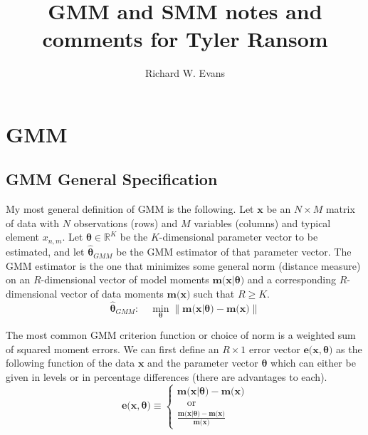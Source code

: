 \documentclass[letterpaper,12pt]{article}
\theoremstyle{definition}
\newcommand\norm[1]{\left\lVert#1\right\rVert}
\begin{document}
\title{GMM and SMM notes and comments for Tyler Ransom}
\author{Richard W. Evans}
\maketitle



\section{GMM}\label{SecGMM}

  \setcounter{subsection}{-1}

  \subsection{GMM General Specification}\label{SecGMMgen}

    My most general definition of GMM is the following. Let $\bm{x}$ be an $N\times M$ matrix of data with $N$ observations (rows) and $M$ variables (columns) and typical element $x_{n,m}$. Let $\bm{\theta}\in\mathbb{R}^K$ be the $K$-dimensional parameter vector to be estimated, and let $\bm{\hat{\theta}}_{GMM}$ be the GMM estimator of that parameter vector. The GMM estimator is the one that minimizes some general norm (distance measure) on an $R$-dimensional vector of model moments $\bm{m}\bigl(\bm{x}|\bm{\theta}\bigr)$ and a corresponding $R$-dimensional vector of data moments $\bm{m}\bigl(\bm{x}\bigr)$ such that $R\geq K$.
    \begin{equation}\label{EqGMMdefgen}
      \bm{\hat{\theta}}_{GMM}:\quad \min_{\bm{\theta}}\norm{\bm{m}\bigl(\bm{x}|\bm{\theta}\bigr) - \bm{m}\bigl(\bm{x}\bigr)}
    \end{equation}

    The most common GMM criterion function or choice of norm is a weighted sum of squared moment errors. We can first define an $R\times 1$ error vector $\bm{e}\bigl(\bm{x},\bm{\theta}\bigr)$ as the following function of the data $\bm{x}$ and the parameter vector $\bm{\theta}$ which can either be given in levels or in percentage differences (there are advantages to each).
    \begin{equation}\label{EqGMMerrvec}
      \bm{e}\bigl(\bm{x},\bm{\theta}\bigr)\equiv
        \begin{cases}
          \bm{m}\bigl(\bm{x}|\bm{\theta}\bigr) - \bm{m}\bigl(\bm{x}\bigr) \\
          \quad\text{or} \\
          \frac{\bm{m}\bigl(\bm{x}|\bm{\theta}\bigr) - \bm{m}\bigl(\bm{x}\bigr)}{\bm{m}\bigl(\bm{x}\bigr)}
        \end{cases}
    \end{equation}
\end{document}
